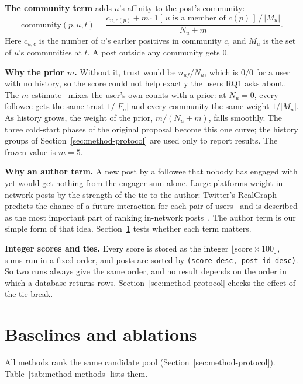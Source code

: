 \textbf{The community term} adds $u$'s affinity to the post's community:
\begin{equation}
  \text{community}(p,u,t) = \frac{c_{u,c(p)} + m \cdot \mathbf{1}[\,u \text{ is a member of } c(p)\,] \,/\, |M_u|}{N_u + m}.
  \label{eq:method-community}
\end{equation}
\noindent Here $c_{u,c}$ is the number of $u$'s earlier positives in community $c$, and $M_u$ is the set of $u$'s communities at $t$. A post outside any community gets 0.

\textbf{Why the prior $m$.} Without it, trust would be $n_{uf}/N_u$, which is $0/0$ for a user with no history, so the score could not help exactly the users RQ1 asks about. The $m$-estimate~ mixes the user's own counts with a prior: at $N_u = 0$, every followee gets the same trust $1/|F_u|$ and every community the same weight $1/|M_u|$. As history grows, the weight of the prior, $m/(N_u + m)$, falls smoothly. The three cold-start phases of the original proposal become this one curve; the history groups of Section~\ref{sec:method-protocol} are used only to report results. The frozen value is $m = 5$.

\textbf{Why an author term.} A new post by a followee that nobody has engaged with yet would get nothing from the engager sum alone. Large platforms weight in-network posts by the strength of the tie to the author: Twitter's RealGraph predicts the chance of a future interaction for each pair of users~ and is described as the most important part of ranking in-network posts~. The author term is our simple form of that idea. Section~\ref{sec:method-baselines} tests whether each term matters.

\textbf{Integer scores and ties.} Every score is stored as the integer $\lfloor \text{score} \times 100 \rfloor$, sums run in a fixed order, and posts are sorted by \texttt{(score desc, post id desc)}. So two runs always give the same order, and no result depends on the order in which a database returns rows. Section~\ref{sec:method-protocol} checks the effect of the tie-break.

\section{Baselines and ablations}
\label{sec:method-baselines}

All methods rank the same candidate pool (Section~\ref{sec:method-protocol}). Table~\ref{tab:method-methods} lists them.

